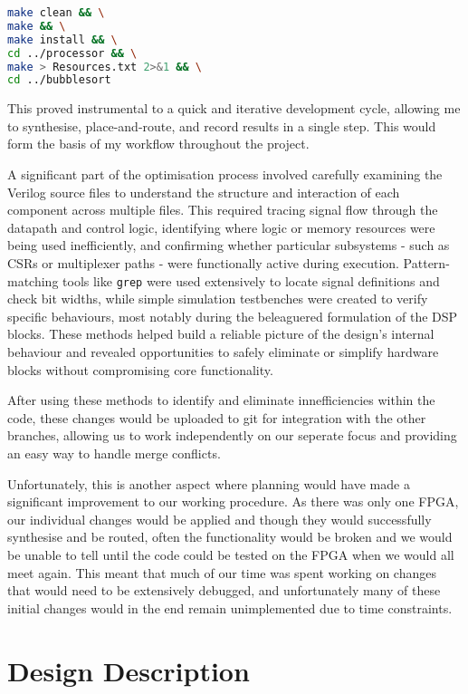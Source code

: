 \documentclass[a4paper,10pt]{article}
\begin{document}
\begin{lstlisting}[language=bash,
    caption={Workflow used to synthesise and record results},
    label={prog:Workflow}]
make clean && \
make && \
make install && \
cd ../processor && \
make > Resources.txt 2>&1 && \
cd ../bubblesort
\end{lstlisting}

This proved instrumental to a quick and iterative development cycle, 
allowing me to synthesise, place-and-route, and record results in a single step.
This would form the basis of my workflow throughout the project.

A significant part of the optimisation process involved 
carefully examining the Verilog source files to understand 
the structure and interaction of each component
across multiple files. 
This required tracing signal flow through the datapath and control logic, 
identifying where logic or memory resources were being used inefficiently, 
and confirming whether particular subsystems - 
such as CSRs or multiplexer paths - 
were functionally active during execution. 
Pattern-matching tools like \texttt{grep} were used extensively 
to locate signal definitions and check bit widths, 
while simple simulation testbenches were created to verify specific behaviours,
most notably during the beleaguered formulation of the DSP blocks.
These methods helped build a reliable picture of the design's internal behaviour 
and revealed opportunities to safely eliminate or simplify hardware blocks 
without compromising core functionality.

After using these methods to identify and eliminate innefficiencies within the code,
these changes would be uploaded to git for integration with the other branches,
allowing us to work independently on our seperate focus and
providing an easy way to handle merge conflicts.

Unfortunately, this is another aspect where planning would have made a significant
improvement to our working procedure. 
As there was only one FPGA, our individual changes would be applied and
though they would successfully synthesise and be routed,
often the functionality would be broken and we would be unable to tell until 
the code could be tested on the FPGA when we would all meet again.
This meant that much of our time was spent working on changes that would 
need to be extensively debugged, and unfortunately many of these initial changes
would in the end remain unimplemented due to time constraints.

\section{Design Description}
\label{sec:Design_Description}
\end{document}
